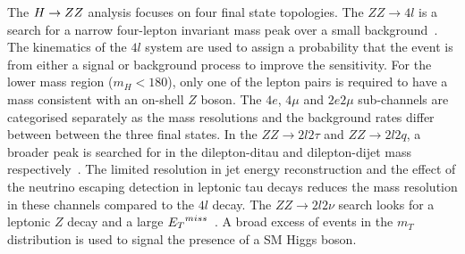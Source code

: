 The $H\rightarrow ZZ$ analysis focuses on four final state topologies.
The $ZZ\rightarrow 4l$ is a search for a narrow four-lepton invariant mass 
peak over a small background~\citep{HIG-12-016}. The kinematics of the $4l$ system are used
to assign a probability that the event is from either a signal or background 
process to improve the sensitivity. For the lower mass region ($m_{H}<180$),
only one of the lepton pairs is required to have a mass consistent with an 
on-shell $Z$ boson.
The $4e$, $4\mu$ and $2e2\mu$ sub-channels are categorised separately as the 
mass resolutions and the background rates differ between between the three 
final states. In the $ZZ\rightarrow 2l2\tau$ and $ZZ\rightarrow 2l2q$, 
a broader peak is searched for in the dilepton-ditau and dilepton-dijet
mass respectively~\citep{HIG-12-016,HIG-11-027}. 
The limited resolution in jet energy reconstruction
and the effect of the neutrino escaping detection in leptonic tau decays
reduces the mass resolution in these channels compared to the $4l$ decay.
The $ZZ\rightarrow 2l2\nu$ search looks for a leptonic $Z$ decay
and a large ${E_{T}}^{miss}$~\citep{HIG-12-023}. A broad excess of events in the $m_{T}$ distribution
is used to signal the presence of a SM Higgs boson.


